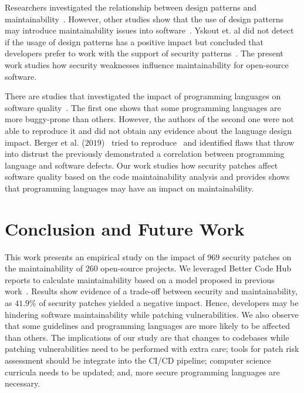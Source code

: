 \documentclass[smallextended]{svjour3}       %
\begin{document}
Researchers investigated the relationship between design patterns and
maintainability~\cite{10.1007/978-3-642-35267-6-18}. However, other studies show that 
the use of design patterns may introduce maintainability issues into
software~\cite{4493325}. Yskout et. al did not detect if the usage of 
design patterns has a positive impact but concluded that developers prefer to 
work with the support of security patterns~\cite{8077802}. The present work 
studies how security weaknesses influence maintainability for open-source software.

There are studies that investigated the impact of programming languages on software
quality~\cite{Ray:2014:LSS:2635868.2635922,Ray:2017:LSP:3144574.3126905}. The first
one shows that some programming languages are more buggy-prone than others. However,
the authors of the second one were not able to reproduce it and did not obtain any
evidence about the language design impact. 
Berger et al. ($2019$)~\cite{2019arXiv190110220B} tried to reproduce~\cite{Ray:2014:LSS:2635868.2635922,Ray:2017:LSP:3144574.3126905} 
and identified flaws that throw into distrust the 
previously demonstrated a correlation between programming language and software 
defects. Our work studies how security patches affect software quality based 
on the code maintainability analysis and provides shows that programming languages 
may have an impact on maintainability.

\section{Conclusion and Future Work}\label{sec:conclusions}

This work presents an empirical study on the impact of $969$ security
patches on the maintainability of $260$ open-source projects. We leveraged
Better Code Hub reports to calculate maintainability based on a model proposed in 
previous work~\cite{Olivari:2018,8919169}. Results show evidence of a 
trade-off between security and maintainability, as $41.9\%$ of security patches 
yielded a negative impact. Hence,
developers may be hindering software maintainability while patching 
vulnerabilities. We also observe that some guidelines 
and programming languages are more likely to be affected than others. The implications 
of our study are that changes to codebases while patching 
vulnerabilities need to be performed with extra care; tools
for patch risk assessment should be integrate into the CI/CD pipeline; computer science
curricula needs to be updated; and, more secure programming languages are necessary.
\end{document}
